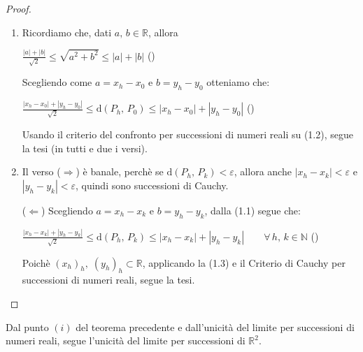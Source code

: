 \begin{proof}
\mbox{}
\begin{enumerate}[labelindent=\parindent,leftmargin=*,label=\textnormal{(\roman*)},start=1]
\item Ricordiamo che, dati $a,\, b \in \mathbb{R}$, allora
\begin{center}
\hfill
$\displaystyle \frac{|a|+|b|}{\sqrt{2}} \leq \sqrt{a^2+b^2} \leq |a|+|b|$
\hfill{}\textnormal{(\theequation)}
\end{center}
Scegliendo come $a=x_h-x_0$ e $b=y_h-y_0$ otteniamo che:
\begin{center}
\hfill
$\displaystyle \frac{|x_h-x_0|+|y_h-y_0|}{\sqrt{2}} \leq \mathrm{d}(P_h,\,P_0) \leq |x_h-x_0|+|y_h-y_0|$
\hfill{}\textnormal{(\theequation)}
\end{center}

Usando il criterio del confronto per successioni di numeri reali su \textnormal{(1.2)}, segue la tesi (in tutti e due i versi).

\item Il verso \textnormal{(}$\Rightarrow$\textnormal{)} è banale, perchè se $\mathrm{d}(P_h,\, P_k) < \varepsilon$, allora anche $|x_h-x_k| < \varepsilon$ e $|y_h-y_k| < \varepsilon$, quindi sono successioni di Cauchy.

\textnormal{(}$\Leftarrow$\textnormal{)} Scegliendo $a=x_h-x_k$ e $b=y_h-y_k$, dalla \textnormal{(1.1)} segue che:
\begin{center}
\hfill
$\displaystyle \frac{|x_h-x_k|+|y_h-y_k|}{\sqrt{2}} \leq \mathrm{d}(P_h,\,P_k) \leq |x_h-x_k|+|y_h-y_k| \qquad \forall \, h,\, k \in \mathbb{N}$
\hfill{}\textnormal{(\theequation)}
\end{center}
Poichè $(x_h)_h,\; (y_h)_h \subset \mathbb{R}$, applicando la \textnormal{(1.3)} e il Criterio di Cauchy per successioni di numeri reali, segue la tesi.

\end{enumerate}
\end{proof}

\begin{obs}
Dal punto $(i)$ del teorema precedente e dall'unicità del limite per successioni di numeri reali, segue l'unicità del limite per successioni di $\mathbb{R}^2$.
\end{obs}

